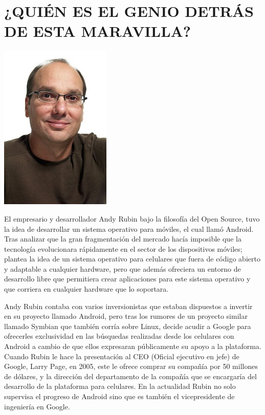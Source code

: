 \section*{¿QUIÉN ES EL GENIO DETRÁS DE ESTA MARAVILLA?}

\includegraphics[scale=0.7]{img/cp05/img0502.png}

El empresario y desarrollador Andy Rubin bajo la filosofía del Open Source, tuvo la idea de desarrollar un sistema operativo para móviles, el cual llamó Android. Tras analizar 
que la gran fragmentación del mercado hacía imposible que la tecnología evolucionara rápidamente en el sector de los dispositivos móviles; plantea la idea de un sistema operativo 
para celulares que fuera de código abierto y adaptable a cualquier hardware, pero que además ofreciera un entorno de desarrollo libre que permitiera crear aplicaciones para este 
sistema operativo y que corriera en cualquier hardware que lo soportara.
 
Andy Rubin contaba con varios inversionistas que estaban dispuestos a invertir en su proyecto llamado Android, pero tras los rumores de un proyecto similar llamado Symbian que 
también corría sobre Linux, decide acudir a Google para ofrecerles exclusividad en las búsquedas realizadas desde los celulares con Android a cambio de que ellos expresaran 
públicamente su apoyo a la plataforma. Cuando Rubin le hace la presentación al CEO (Oficial ejecutivo en jefe) de Google, Larry Page, en 2005, este le ofrece comprar su compañía 
por 50 millones de dólares, y la dirección del departamento de la compañía que se encargaría del desarrollo de la plataforma para celulares. En la actualidad Rubin no solo 
supervisa el progreso de Android sino que es también el vicepresidente de ingeniería en Google.


